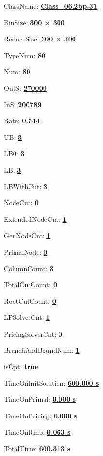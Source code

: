 \documentclass[11pt]{article}
\begin{document}
\pagestyle{empty}


ClassName: \underline{\textbf{Class_06.2bp-31}}
\par
BinSize: \underline{\textbf{300 × 300}}
\par
ReduceSize: \underline{\textbf{300 × 300}}
\par
TypeNum: \underline{\textbf{80}}
\par
Num: \underline{\textbf{80}}
\par
OutS: \underline{\textbf{270000}}
\par
InS: \underline{\textbf{200789}}
\par
Rate: \underline{\textbf{0.744}}
\par
UB: \underline{\textbf{3}}
\par
LB0: \underline{\textbf{3}}
\par
LB: \underline{\textbf{3}}
\par
LBWithCut: \underline{\textbf{3}}
\par
NodeCut: \underline{\textbf{0}}
\par
ExtendedNodeCnt: \underline{\textbf{1}}
\par
GenNodeCnt: \underline{\textbf{1}}
\par
PrimalNode: \underline{\textbf{0}}
\par
ColumnCount: \underline{\textbf{3}}
\par
TotalCutCount: \underline{\textbf{0}}
\par
RootCutCount: \underline{\textbf{0}}
\par
LPSolverCnt: \underline{\textbf{1}}
\par
PricingSolverCnt: \underline{\textbf{0}}
\par
BranchAndBoundNum: \underline{\textbf{1}}
\par
isOpt: \underline{\textbf{true}}
\par
TimeOnInitSolution: \underline{\textbf{600.000 s}}
\par
TimeOnPrimal: \underline{\textbf{0.000 s}}
\par
TimeOnPricing: \underline{\textbf{0.000 s}}
\par
TimeOnRmp: \underline{\textbf{0.063 s}}
\par
TotalTime: \underline{\textbf{600.313 s}}
\par
\newpage
\end{document}
